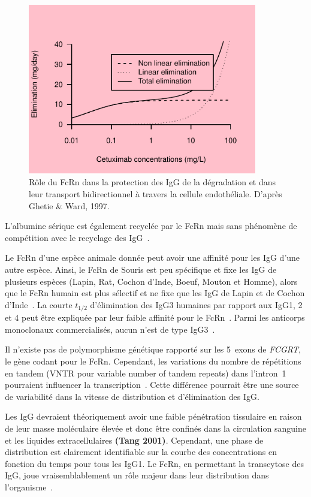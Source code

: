 \begin{figure}[htbp]
	\centering
		\includegraphics[width=10cm]{images/essai001.pdf}
	\caption[Rôle du FcRn]{Rôle du FcRn dans la protection des IgG de la dégradation et dans leur transport bidirectionnel à travers la cellule endothéliale. D'après Ghetie \& Ward, 1997.}
	\label{fig:14}
\end{figure}

L'albumine sérique est également recyclée par le FcRn mais sans phénomène de compétition avec le recyclage des IgG~\citep{REF38}.

Le FcRn d'une espèce animale donnée peut avoir une affinité pour les IgG d'une autre espèce. Ainsi, le FcRn de Souris est peu spécifique et fixe les IgG de plusieurs espèces (Lapin, Rat, Cochon d'Inde, Boeuf, Mouton et Homme), alors que le FcRn humain est plus sélectif et ne fixe que les IgG de Lapin et de Cochon d'Inde~\citep{REF36}. La courte $t_{1/2}$ d'élimination des IgG3 humaines par rapport aux IgG1, 2 et 4 peut être expliquée par leur faible affinité pour le FcRn~\citep{REF35}. Parmi les anticorps monoclonaux commercialisés, aucun n'est de type IgG3~\citep{REF39}.

Il n'existe pas de polymorphisme génétique rapporté sur les 5~exons de \textit{FCGRT}, le gène codant pour le FcRn. Cependant, les variations du nombre de répétitions en tandem (VNTR pour variable number of tandem repeats) dans l'intron~1 pourraient influencer la transcription~\citep{REF40}. Cette différence pourrait être une source de variabilité dans la vitesse de distribution et d'élimination des IgG.

Les IgG devraient théoriquement avoir une faible pénétration tissulaire en raison de leur masse moléculaire élevée et donc être confinés dans la circulation sanguine et les liquides extracellulaires \textbf{(Tang 2001)}. Cependant, une phase de distribution est clairement identifiable sur la courbe des concentrations en fonction du temps pour tous les IgG1. Le FcRn, en permettant la transcytose des IgG, joue vraisemblablement un rôle majeur dans leur distribution dans l'organisme~\citep{REF31, REF41}.
